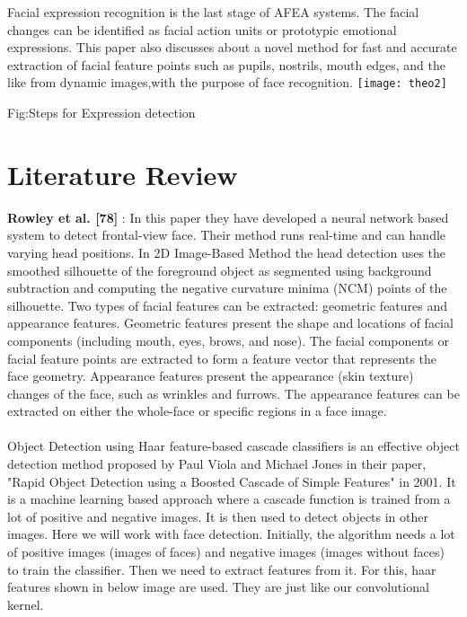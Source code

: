 \documentclass[journal]{IEEEtran}
\begin{document}
Facial expression recognition is the last stage of AFEA systems. The facial
changes can be identified as facial action units or prototypic emotional expressions. This paper also discusses about a novel method for fast and accurate extraction of facial feature points such as pupils, nostrils, mouth edges, and the like from dynamic images,with the purpose of face recognition.
{\texttt{[image: theo2]}}
\begin{center}
Fig:Steps for Expression detection
\end{center}


\section{Literature Review}
\textbf {Rowley et al. [78]} : In this paper they have developed a neural network based system to detect frontal-view face. Their method runs real-time and can handle varying head positions. In 2D Image-Based Method the head detection uses the smoothed silhouette of the foreground object as segmented using background subtraction and computing the negative curvature minima (NCM) points of the silhouette.
 Two types of facial features can be extracted: geometric features and appearance features. Geometric features present the shape and locations of facial components (including mouth, eyes, brows, and nose). The facial components or facial feature points are extracted to form a feature vector that represents the face geometry. Appearance features present the appearance (skin texture) changes of the face, such as wrinkles and furrows. The appearance features can be extracted on either the whole-face or specific regions in a face image.\\ \\
 Object Detection using Haar feature-based cascade classifiers is an effective object detection method proposed by Paul Viola and Michael Jones in their paper, "Rapid Object Detection using a Boosted Cascade of Simple Features" in 2001. It is a machine learning based approach where a cascade function is trained from a lot of positive and negative images. It is then used to detect objects in other images.
 Here we will work with face detection. Initially, the algorithm needs a lot of positive images (images of faces) and negative images (images without faces) to train the classifier. Then we need to extract features from it. For this, haar features shown in below image are used. They are just like our convolutional kernel.\\ \\
\end{document}
